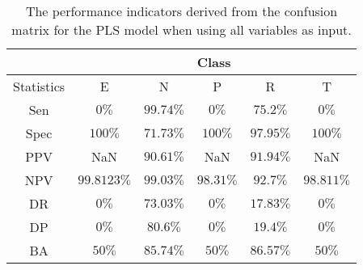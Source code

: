 \begin{table}[!ht]
	\centering
	\begin{tabular}{|c|c|c|c|c|c|}
		\hline
		 & \multicolumn{5}{c|}{Class} \\ \hline
		Statistics & E & N & P & R & T \\ \hline
		Sen & $0\%$ & $99.74\%$ & $0\%$ & $75.2\%$ & $0\%$ \\ \hline
		Spec & $100\%$ & $71.73\%$ & $100\%$ & $97.95\%$ & $100\%$ \\ \hline
		PPV & NaN & $90.61\%$ & NaN & $91.94\%$ & NaN \\ \hline
		NPV & $99.8123\%$ & $99.03\%$ & $98.31\%$ & $92.7\%$ & $98.811\%$ \\ \hline
		DR & $0\%$ & $73.03\%$ & $0\%$ & $17.83\%$ & $0\%$ \\ \hline
		DP & $0\%$ & $80.6\%$ & $0\%$ & $19.4\%$ & $0\%$ \\ \hline
		BA & $50\%$ & $85.74\%$ & $50\%$ & $86.57\%$ & $50\%$ \\ \hline
	\end{tabular}
	\caption{The performance indicators derived from the confusion matrix for the PLS model when using all variables as input.}
	\label{tab:cs:reverse:all:pls}
\end{table}
